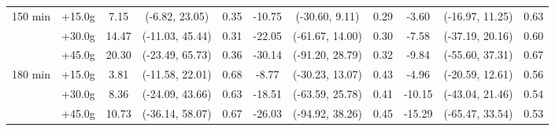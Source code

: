 \begin{table}[ht]
{\begin{tabular}{llccccccccc}
\midrule
\multirow{3}{*}{150 min} & +15.0g & 7.15 & (-6.82, 23.05) & 0.35 & -10.75 & (-30.60, 9.11) & 0.29 & -3.60 & (-16.97, 11.25) & 0.63 \\
 & +30.0g & 14.47 & (-11.03, 45.44) & 0.31 & -22.05 & (-61.67, 14.00) & 0.30 & -7.58 & (-37.19, 20.16) & 0.60 \\
 & +45.0g & 20.30 & (-23.49, 65.73) & 0.36 & -30.14 & (-91.20, 28.79) & 0.32 & -9.84 & (-55.60, 37.31) & 0.67 \\
\midrule
\multirow{3}{*}{180 min} & +15.0g & 3.81 & (-11.58, 22.01) & 0.68 & -8.77 & (-30.23, 13.07) & 0.43 & -4.96 & (-20.59, 12.61) & 0.56 \\
 & +30.0g & 8.36 & (-24.09, 43.66) & 0.63 & -18.51 & (-63.59, 25.78) & 0.41 & -10.15 & (-43.04, 21.46) & 0.54 \\
 & +45.0g & 10.73 & (-36.14, 58.07) & 0.67 & -26.03 & (-94.92, 38.26) & 0.45 & -15.29 & (-65.47, 33.54) & 0.53 \\
\bottomrule
\end{tabular}%
}
\end{table}
